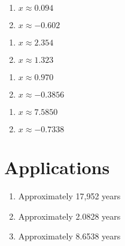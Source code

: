 \begin{multicols}{2}
\begin{enumerate}	\setcounter{enumi}{\value{Review}}
    \item $x \approx 0.094$
    \item $x \approx -0.602$
\end{enumerate} \setcounter{Review}{\value{enumi}}
\end{multicols}
\begin{multicols}{2}
\begin{enumerate}	\setcounter{enumi}{\value{Review}}
    \item $x \approx 2.354$
    \item $x \approx 1.323$
\end{enumerate} \setcounter{Review}{\value{enumi}}
\end{multicols}
\begin{multicols}{2}
\begin{enumerate}	\setcounter{enumi}{\value{Review}}
    \item $x \approx 0.970$
    \item $x \approx -0.3856$
\end{enumerate}		\setcounter{Review}{\value{enumi}}
\end{multicols}
\begin{multicols}{2}
\begin{enumerate}	\setcounter{enumi}{\value{Review}}
    \item $x \approx 7.5850$
    \item $x \approx -0.7338$
\end{enumerate}		\setcounter{Review}{\value{enumi}}
\end{multicols}

\section*{Applications}

\begin{enumerate}
	\item Approximately 17,952 years
	\item Approximately 2.0828 years
    \item Approximately 8.6538 years
\end{enumerate}